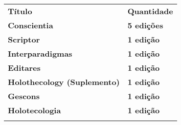 \documentclass[
]{article}
\begin{document}
\begin{longtable}[]{@{}
  >{\raggedright\arraybackslash}p{}
  >{\raggedright\arraybackslash}p{}@{}}
\toprule\noalign{}
\begin{minipage}[b]{\linewidth}\centering
\textbf{Título}
\end{minipage} & \begin{minipage}[b]{\linewidth}\centering
\textbf{Quantidade}
\end{minipage} \\
\begin{minipage}[b]{\linewidth}\raggedright
\textbf{Conscientia}
\end{minipage} & \begin{minipage}[b]{\linewidth}\raggedright
\textbf{5 edições}
\end{minipage} \\
\begin{minipage}[b]{\linewidth}\raggedright
\textbf{Scriptor}
\end{minipage} & \begin{minipage}[b]{\linewidth}\raggedright
\textbf{1 edição}
\end{minipage} \\
\begin{minipage}[b]{\linewidth}\raggedright
\textbf{Interparadigmas}
\end{minipage} & \begin{minipage}[b]{\linewidth}\raggedright
\textbf{1 edição}
\end{minipage} \\
\begin{minipage}[b]{\linewidth}\raggedright
\textbf{Editares}
\end{minipage} & \begin{minipage}[b]{\linewidth}\raggedright
\textbf{1 edição}
\end{minipage} \\
\begin{minipage}[b]{\linewidth}\raggedright
\textbf{Holothecology (Suplemento)}
\end{minipage} & \begin{minipage}[b]{\linewidth}\raggedright
\textbf{1 edição}
\end{minipage} \\
\begin{minipage}[b]{\linewidth}\raggedright
\textbf{Gescons}
\end{minipage} & \begin{minipage}[b]{\linewidth}\raggedright
\textbf{1 edição}
\end{minipage} \\
\begin{minipage}[b]{\linewidth}\raggedright
\textbf{Holotecologia}
\end{minipage} & \begin{minipage}[b]{\linewidth}\raggedright
\textbf{1 edição}
\end{minipage} \\
\midrule\noalign{}
\endhead
\bottomrule\noalign{}
\endlastfoot
\end{longtable}
\end{document}
